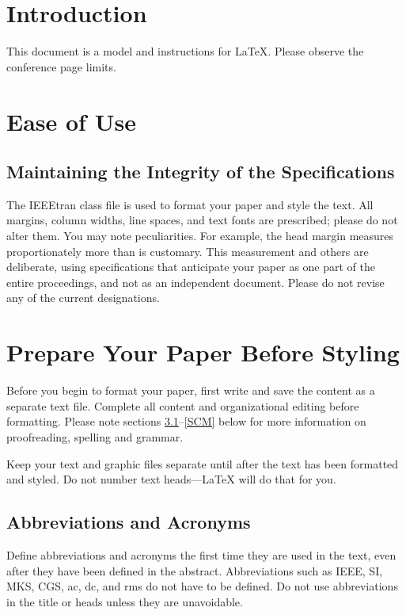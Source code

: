 \documentclass[conference, one column]{IEEEtran}
\begin{document}
\section{Introduction}
This document is a model and instructions for \LaTeX.
Please observe the conference page limits. 

\section{Ease of Use}

\subsection{Maintaining the Integrity of the Specifications}

The IEEEtran class file is used to format your paper and style the text. All margins, 
column widths, line spaces, and text fonts are prescribed; please do not 
alter them. You may note peculiarities. For example, the head margin
measures proportionately more than is customary. This measurement 
and others are deliberate, using specifications that anticipate your paper 
as one part of the entire proceedings, and not as an independent document. 
Please do not revise any of the current designations.

\section{Prepare Your Paper Before Styling}
Before you begin to format your paper, first write and save the content as a 
separate text file. Complete all content and organizational editing before 
formatting. Please note sections \ref{AA}--\ref{SCM} below for more information on 
proofreading, spelling and grammar.

Keep your text and graphic files separate until after the text has been 
formatted and styled. Do not number text heads---{\LaTeX} will do that 
for you.

\subsection{Abbreviations and Acronyms}\label{AA}
Define abbreviations and acronyms the first time they are used in the text, 
even after they have been defined in the abstract. Abbreviations such as 
IEEE, SI, MKS, CGS, ac, dc, and rms do not have to be defined. Do not use 
abbreviations in the title or heads unless they are unavoidable.
\end{document}
